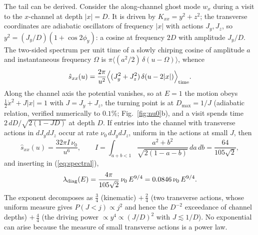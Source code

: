 \documentclass[11pt,a4paper]{article}
\begin{document}
The tail can be derived. Consider the along-channel ghost mode $w_x$ during a visit to the
$x$-channel at depth $|x|=D$. It is driven by $K_{xx}=y^2+z^2$; the transverse coordinates are
adiabatic oscillators of frequency $|x|$ with actions $J_y,J_z$, so $y^2=(J_y/D)(1+\cos2\phi_y)$: a
cosine at frequency $2D$ with amplitude $J_y/D$. The two-sided spectrum per unit time of a slowly
chirping cosine of amplitude $a$ and instantaneous frequency $\Omega$ is $\pi\langle
(a^2/2)\,\delta(u-\Omega)\rangle$, whence
\begin{equation}
\hat s_{xx}(u)=\frac{2\pi}{u^2}\Big\langle (J_y^2+J_z^2)\,\delta(u-2|x|)\Big\rangle_{\rm time}.
\end{equation}
Along the channel axis the potential vanishes, so at $E=1$ the motion obeys
$\tfrac12\dot x^2+J|x|=1$ with $J=J_y+J_z$, the turning point is at $D_{\max}=1/J$ (adiabatic
relation, verified numerically to $0.1\%$; Fig.~\ref{fig:nu0}b), and a visit spends time
$2\,dD/\sqrt{2(1-JD)}$ at depth $D$. If entries into the channel with transverse actions in
$dJ_ydJ_z$ occur at rate $\nu_0\,dJ_ydJ_z$, uniform in the actions at small $J$, then
\begin{equation}
\hat s_{xx}(u)=\frac{32\pi I\,\nu_0}{u^6},\qquad
I=\int_{a+b<1}\frac{a^2+b^2}{\sqrt{2(1-a-b)}}\,da\,db=\frac{64}{105\sqrt2},
\label{eq:tail}
\end{equation}
and inserting in (\ref{eq:spectral}),
\begin{equation}
\lambda_{\rm diag}(E)=\frac{4\pi}{105\sqrt2}\,\nu_0\,E^{9/4}=0.0846\,\nu_0\,E^{9/4}.
\label{eq:law}
\end{equation}
The exponent decomposes as $\tfrac34$ (kinematic) $+\,\tfrac24$ (two transverse actions, whose
uniform measure gives $P(J<j)\propto j^2$ and hence the $D^{-2}$ exceedance of channel depths)
$+\,\tfrac44$ (the driving power $\propto y^4\propto(J/D)^2$ with $J\lesssim1/D$). No exponential
can arise because the measure of small transverse actions is a power law.
\end{document}
